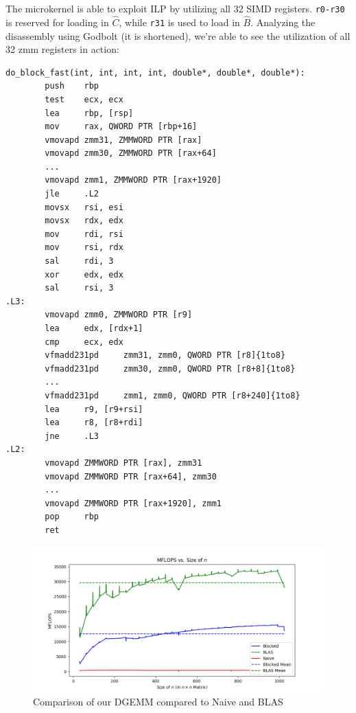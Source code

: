 \documentclass{article}
\begin{document}
The microkernel is able to exploit ILP by utilizing all 32 SIMD registers. \verb|r0-r30| is reserved for loading in $\hat{C}$, while \verb|r31| is used to load in $\hat{B}$. Analyzing the disassembly using Godbolt (it is shortened), we're able to see the utilization of all 32 zmm registers in action:
\label{do-block-fast-asm}
\begin{verbatim}
do_block_fast(int, int, int, int, double*, double*, double*):
        push    rbp
        test    ecx, ecx
        lea     rbp, [rsp]
        mov     rax, QWORD PTR [rbp+16]
        vmovapd zmm31, ZMMWORD PTR [rax]
        vmovapd zmm30, ZMMWORD PTR [rax+64]
        ...
        vmovapd zmm1, ZMMWORD PTR [rax+1920]
        jle     .L2
        movsx   rsi, esi
        movsx   rdx, edx
        mov     rdi, rsi
        mov     rsi, rdx
        sal     rdi, 3
        xor     edx, edx
        sal     rsi, 3
.L3:
        vmovapd zmm0, ZMMWORD PTR [r9]
        lea     edx, [rdx+1]
        cmp     ecx, edx
        vfmadd231pd     zmm31, zmm0, QWORD PTR [r8]{1to8}
        vfmadd231pd     zmm30, zmm0, QWORD PTR [r8+8]{1to8}
        ...
        vfmadd231pd     zmm1, zmm0, QWORD PTR [r8+240]{1to8}
        lea     r9, [r9+rsi]
        lea     r8, [r8+rdi]
        jne     .L3
.L2:
        vmovapd ZMMWORD PTR [rax], zmm31
        vmovapd ZMMWORD PTR [rax+64], zmm30
        ...
        vmovapd ZMMWORD PTR [rax+1920], zmm1
        pop     rbp
        ret
\end{verbatim}

\begin{figure}[H]
  \centerline{\includegraphics[width=6in]{figures/MFLOPS_compare.png}}
  \caption{Comparison of our DGEMM compared to Naive and BLAS}
  \label{fig:compare-dgemm}
\end{figure}
\end{document}
